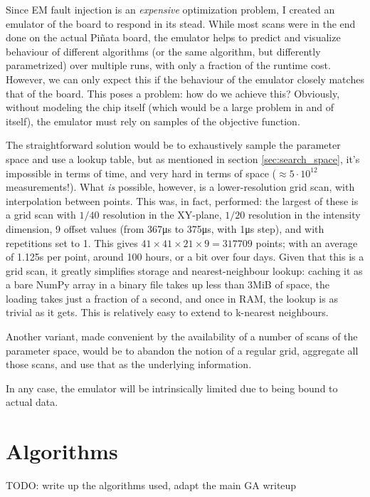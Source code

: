 \documentclass[times, utf8, diplomski]{fer}
\begin{document}
Since EM fault injection is an \emph{expensive} optimization problem, I created
an emulator of the board to respond in its stead. While most scans were in the
end done on the actual Piñata board, the emulator helps to predict and visualize
behaviour of different algorithms (or the same algorithm, but differently
parametrized) over multiple runs, with only a fraction of the runtime cost.
However, we can only expect this if the behaviour of the emulator closely
matches that of the board. This poses a problem: how do we achieve this?
Obviously, without modeling the chip itself (which would be a large problem
in and of itself), the emulator must rely on samples of the objective function.

The straightforward solution would be to exhaustively sample the parameter space
and use a lookup table, but as mentioned in section \ref{sec:search_space}, it's
impossible in terms of time, and very hard in terms of space ($\approx 5 \cdot
10^{12}$ measurements!). What \emph{is} possible, however, is a lower-resolution
grid scan, with interpolation between points. This was, in fact, performed: the
largest of these is a grid scan with $1/40$ resolution in the XY-plane, $1/20$
resolution in the intensity dimension, 9 offset values (from 367μs to 375μs,
with 1μs step), and with repetitions set to 1. This gives $41 \times 41 \times
21 \times 9 = 317709$ points; with an average of 1.125s per point, around 100
hours, or a bit over four days. Given that this is a grid scan, it greatly
simplifies storage and nearest-neighbour lookup: caching it as a bare NumPy
array in a binary file takes up less than 3MiB of space, the loading takes
just a fraction of a second, and once in RAM, the lookup is as trivial as it
gets. This is relatively easy to extend to k-nearest neighbours.

Another variant, made convenient by the availability of a number of scans of the
parameter space, would be to abandon the notion of a regular grid, aggregate all
those scans, and use that as the underlying information.


In any case, the emulator will be intrinsically limited due to being bound to
actual data.


\section{Algorithms}

TODO: write up the algorithms used, adapt the main GA writeup
\end{document}
